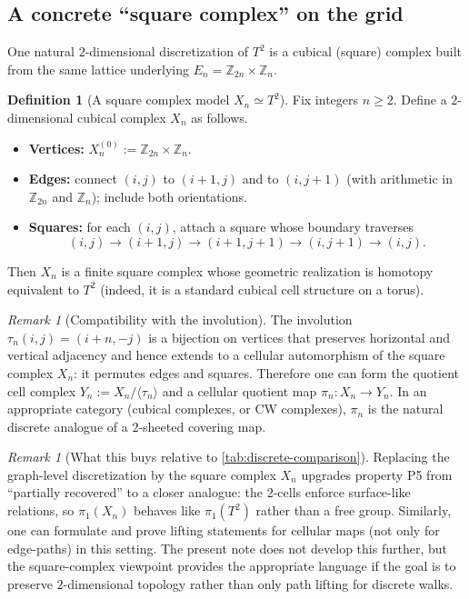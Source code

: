 \documentclass[11pt,a4paper]{article}
\theoremstyle{definition}
\newtheorem{definition}[theorem]{Definition}
\theoremstyle{remark}
\newtheorem{remark}[theorem]{Remark}
\begin{document}
\subsection{A concrete ``square complex'' on the grid}
\label{sec:square-complex}

One natural \(2\)-dimensional discretization of \(T^2\) is a cubical (square) complex built from the same lattice underlying \(E_n=\mathbb{Z}_{2n}\times\mathbb{Z}_n\).

\begin{definition}[A square complex model \(X_n\simeq T^2\)]
\label{def:square-complex}
Fix integers \(n\ge 2\). Define a \(2\)-dimensional cubical complex \(X_n\) as follows.
\begin{itemize}
  \item \textbf{Vertices:} \(X_n^{(0)}:=\mathbb{Z}_{2n}\times\mathbb{Z}_n\).
  \item \textbf{Edges:} connect \((i,j)\) to \((i+1,j)\) and to \((i,j+1)\) (with arithmetic in \(\mathbb{Z}_{2n}\) and \(\mathbb{Z}_n\)); include both orientations.
  \item \textbf{Squares:} for each \((i,j)\), attach a square whose boundary traverses
  \[
  (i,j)\to(i+1,j)\to(i+1,j+1)\to(i,j+1)\to(i,j).
  \]
\end{itemize}
Then \(X_n\) is a finite square complex whose geometric realization is homotopy equivalent to \(T^2\) (indeed, it is a standard cubical cell structure on a torus).
\end{definition}

\begin{remark}[Compatibility with the involution]
\label{rem:cellular-involution}
The involution \(\tau_n(i,j)=(i+n,-j)\) is a bijection on vertices that preserves horizontal and vertical adjacency and hence extends to a cellular automorphism of the square complex \(X_n\): it permutes edges and squares. Therefore one can form the quotient cell complex \(Y_n:=X_n/\langle\tau_n\rangle\) and a cellular quotient map \(\pi_n:X_n\to Y_n\). In an appropriate category (cubical complexes, or CW complexes), \(\pi_n\) is the natural discrete analogue of a \(2\)-sheeted covering map.
\end{remark}

\begin{remark}[What this buys relative to \cref{tab:discrete-comparison}]
\label{rem:what-square-buys}
Replacing the graph-level discretization by the square complex \(X_n\) upgrades property P5 from ``partially recovered'' to a closer analogue: the \(2\)-cells enforce surface-like relations, so \(\pi_1(X_n)\) behaves like \(\pi_1(T^2)\) rather than a free group. Similarly, one can formulate and prove lifting statements for cellular maps (not only for edge-paths) in this setting. The present note does not develop this further, but the square-complex viewpoint provides the appropriate language if the goal is to preserve \(2\)-dimensional topology rather than only path lifting for discrete walks.
\end{remark}
\end{document}
